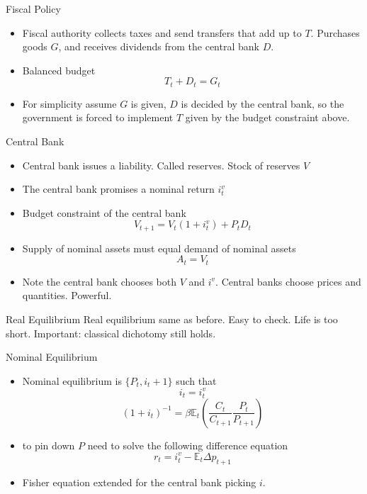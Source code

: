 \documentclass[11pt,aspectratio=169,xcolor={dvipsnames},hyperref={pdftex,pdfpagemode=UseNone,hidelinks,pdfdisplaydoctitle=true},usepdftitle=false]{beamer}
\begin{document}
\begin{frame}{Fiscal Policy}
\begin{itemize}
\item Fiscal authority collects taxes and send transfers that add up to $T$. Purchases goods $G$, and receives dividends from the central bank $D$.
\item Balanced budget $$T_t + D_t = G_t$$
\item For simplicity assume $G$ is given, $D$ is decided by the central bank, so the government is forced to implement $T$ given by the budget constraint above.
\end{itemize}
\end{frame}


\begin{frame}{Central Bank}
\begin{itemize}
\item Central bank issues a liability. Called reserves. Stock of reserves $V$
\item The central bank promises a nominal return $i^v_t$
\item Budget constraint of the central bank
$$V_{t+1} = V_t(1+i^v_t) + P_t D_t$$
\item Supply of nominal assets must equal demand of nominal assets
$$A_t = V_t$$
\item Note the central bank chooses both $V$ and $i^v$. Central banks choose prices and quantities. Powerful.
\end{itemize}
\end{frame}

\begin{frame}{Real Equilibrium}
Real equilibrium same as before. Easy to check. Life is too short. Important: classical dichotomy still holds.
\end{frame}

\begin{frame}{Nominal Equilibrium}
\begin{itemize}
\item Nominal equilibrium is $\{P_t, i_t+1\}$ such that
$$i_t = i^v_t$$
$$(1+i_t)^{-1} = \beta \mathbb{E}_t \left(\frac{C_t}{C_{t+1}} \frac{P_t}{P_{t+1}}\right)$$
\item to pin down $P$ need to solve the following difference equation
$$r_t = i^v_t - \mathbb{E}_t \Delta p_{t+1}$$
\item Fisher equation extended for the central bank picking $i$.
\end{itemize}
\end{frame}
\end{document}
